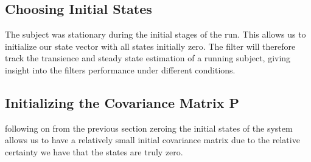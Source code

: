 \subsection{Choosing Initial States}
The subject was stationary during the initial stages of the run. This allows us to initialize our state vector with all states initially zero. The filter will therefore track the transience and steady state estimation of a running subject, giving insight into the filters performance under different conditions. 


\subsection{Initializing the Covariance Matrix P}
following on from the previous section zeroing the initial states of the system allows us to have a relatively small initial covariance matrix due to the relative certainty we have that the states are truly zero. 


 








